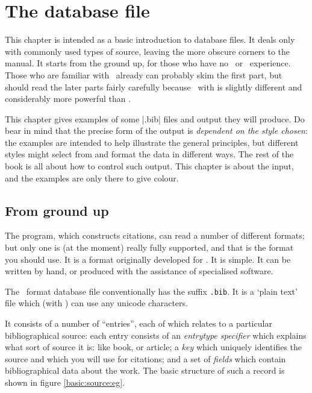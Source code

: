 \chapter{The database file}

This chapter is intended as a basic introduction to database files. It deals only with commonly used types of source, leaving the more obscure corners to the manual. It starts from the ground up, for those who have no \bibtex\ or \biblatex\ experience. Those who are familiar with \bibtex\ already can probably skim the first part, but should read the later parts fairly carefully because \biblatex\, with  is slightly different and considerably more powerful than \bibtex.

This chapter gives examples of some |.bib| files and output they will produce. Do bear in mind that the precise form of the output is \emph{dependent on the style chosen}: the examples are intended to help illustrate the general principles, but different styles might select from and format the data in different ways. The rest of the book is all about how to control such output. This chapter is about the input, and the examples are only there to give colour.

\section{From ground up}

The  program, which constructs citations, can read a number of different formats; but only one is (at the moment) really fully supported, and that is the format you should use. It is a format originally developed for \bibtex. It is simple. It can be written by hand, or produced with the assistance of specialised software.

The \bibtex\ format database file conventionally has the suffix \verb|.bib|. It is a `plain text' file which (with ) can use any unicode characters.

It consists of a number of ``entries'', each of which relates to a particular bibliographical source: each entry consists of an \emph{entrytype specifier} which explains what sort of source it is: like book, or article; a \emph{key} which uniquely identifies the source and which you will use for citations; and a set of \emph{fields} which contain bibliographical data about the work. The basic structure of such a record is shown in figure \ref{basic:source:eg}.

